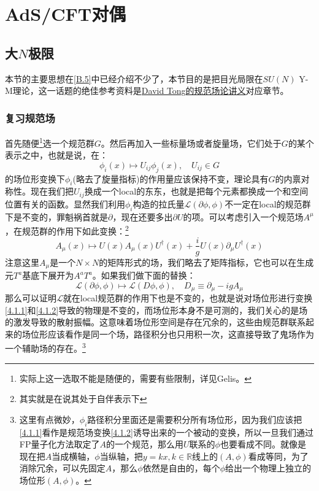 \chapter{AdS/CFT对偶}
\section{大$N$极限}
本节的主要思想在\ref{B.5}中已经介绍不少了，本节目的是把目光局限在$SU(N)$ Y-M理论，这一话题的绝佳参考资料是\href{https://www.damtp.cam.ac.uk/user/tong/gaugetheory.html}{David Tong的规范场论讲义}对应章节。
\subsection{复习规范场}
首先随便\footnote{实际上这一选取不能是随便的，需要有些限制，详见Gelis\cite{Gelis:2019yfm}。}选一个规范群$G$。然后再加入一些标量场或者旋量场，它们处于$G$的某个表示之中，也就是说，在：
\begin{equation}\label{4.1.1}
	\phi_i(x)\mapsto U_{ij}\phi_j(x),\quad U_{ij}\in G
\end{equation}
的场位形变换下$\phi_i$(略去了旋量指标)的作用量应该保持不变，理论具有$G$的内禀对称性。现在我们把$U_{ij}$换成一个local的东东，也就是把每个元素都换成一个和空间位置有关的函数。显然我们利用$\phi_i$构造的拉氏量$\mathcal{L}(\partial\phi,\phi)$不一定在local的规范群下是不变的，罪魁祸首就是$\partial$，现在还要多出$\partial U$的项。可以考虑引入一个规范场$A^\mu$，在规范群的作用下如此变换：\footnote{其实就是在说其处于自伴表示下}
\begin{equation}\label{4.1.2}
	A_\mu(x)\mapsto U(x)A_\mu (x)U^\dagger (x)+\frac i g U(x)\partial_\mu U^\dagger(x)
\end{equation}
注意这里$A_\mu$是一个$N\times N$的矩阵形式的场，我们略去了矩阵指标，它也可以在生成元$T^a$基底下展开为$A^a T^a$。如果我们做下面的替换：
\begin{equation}
	\mathcal{L}(\partial\phi,\phi)\mapsto\mathcal{L}(D\phi,\phi),\quad D_\mu\equiv \partial_\mu -igA_\mu
\end{equation}
那么可以证明$\mathcal{L}$就在local规范群的作用下也是不变的，也就是说对场位形进行变换\ref{4.1.1}和\ref{4.1.2}导致的物理是不变的，而场位形本身不是可测的，我们关心的是场的激发导致的散射振幅。这意味着场位形空间是存在冗余的，这些由规范群联系起来的场位形应该看作是同一个场，路径积分也只用积一次，这直接导致了鬼场作为一个辅助场的存在。\footnote{这里有点微妙，$\phi_i$路径积分里面还是需要积分所有场位形，因为我们应该把\ref{4.1.1}看作是规范场变换\ref{4.1.2}诱导出来的一个被动的变换，所以一旦我们通过FP量子化方法取定了$A$的一个规范，那么用$U$联系的$\phi$也要看成不同。就像是现在把$A$当成横轴，$\phi$当纵轴，把$y=kx,k\in\mathbb{R}$线上的$(A,\phi)$看成等同，为了消除冗余，可以先固定$A$，那么$\phi$依然是自由的，每个$\phi$给出一个物理上独立的场位形$(A,\phi)$。}
